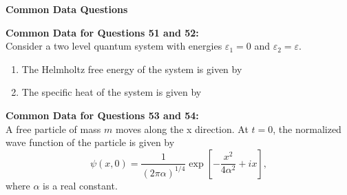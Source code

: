 \documentclass[14pt, a4paper]{extarticle}
\begin{document}
\vspace{1.5em}
\noindent
\textbf{Common Data Questions}
\vspace{1em}

\noindent
\textbf{Common Data for Questions 51 and 52:} \\
Consider a two level quantum system with energies $\varepsilon_1 = 0$ and $\varepsilon_2 = \varepsilon$.

\begin{enumerate}[label=\textbf{Q. \arabic*}, start=51]

\item The Helmholtz free energy of the system is given by
\begin{enumerate}[label=(\Alph*)]
\end{enumerate}

\item The specific heat of the system is given by
\begin{enumerate}[label=(\Alph*)]
\end{enumerate}

\end{enumerate}

\vspace{1.5em}
\noindent
\textbf{Common Data for Questions 53 and 54:} \\
A free particle of mass $m$ moves along the x direction. At $t=0$, the normalized wave function of the particle is given by
\[ \psi(x,0) = \dfrac{1}{(2\pi\alpha)^{1/4}}\exp\left[-\dfrac{x^2}{4\alpha^2} + ix\right], \]
where $\alpha$ is a real constant.
\end{document}
